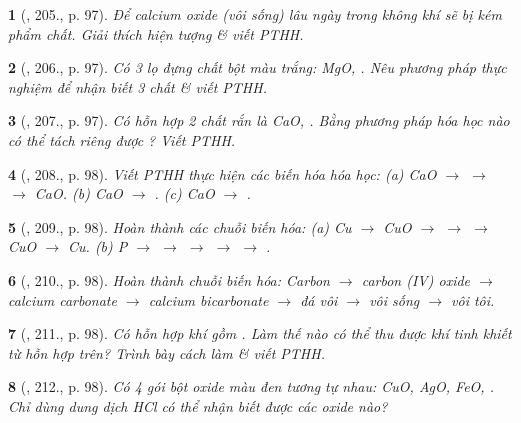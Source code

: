 \documentclass{article}
\newtheorem{baitoan}{}
\begin{document}
\begin{baitoan}[\cite{Nguyen_Buu_Can_500_BT_Hoa_Hoc_THCS}, 205., p. 97]
	Để calcium oxide (vôi sống) lâu ngày trong không khí sẽ bị kém phẩm chất. Giải thích hiện tượng \& viết {\rm PTHH}.
\end{baitoan}

\begin{baitoan}[\cite{Nguyen_Buu_Can_500_BT_Hoa_Hoc_THCS}, 206., p. 97]
	Có 3 lọ đựng chất bột màu trắng: {\rm MgO, }. Nêu phương pháp thực nghiệm để nhận biết 3 chất \& viết {\rm PTHH}.
\end{baitoan}

\begin{baitoan}[\cite{Nguyen_Buu_Can_500_BT_Hoa_Hoc_THCS}, 207., p. 97]
	Có hỗn hợp 2 chất rắn là {\rm CaO, }. Bằng phương pháp hóa học nào có thể tách riêng được {\rm{}}? Viết {\rm PTHH}.
\end{baitoan}

\begin{baitoan}[\cite{Nguyen_Buu_Can_500_BT_Hoa_Hoc_THCS}, 208., p. 98]
	Viết {\rm PTHH} thực hiện các biến hóa hóa học: {\rm(a) CaO $\to$  $\to$  $\to$ CaO. (b) CaO $\to$ . (c) CaO $\to$ }.
\end{baitoan}

\begin{baitoan}[\cite{Nguyen_Buu_Can_500_BT_Hoa_Hoc_THCS}, 209., p. 98]
	Hoàn thành các chuỗi biến hóa: {\rm(a) Cu $\to$ CuO $\to$  $\to$  $\to$ CuO $\to$ Cu. (b) P $\to$  $\to$  $\to$  $\to$  $\to$ }.
\end{baitoan}

\begin{baitoan}[\cite{Nguyen_Buu_Can_500_BT_Hoa_Hoc_THCS}, 210., p. 98]
	Hoàn thành chuỗi biến hóa: Carbon $\to$ carbon ({\rm IV}) oxide $\to$ calcium carbonate $\to$ calcium bicarbonate $\to$ đá vôi $\to$ vôi sống $\to$ vôi tôi.
\end{baitoan}

\begin{baitoan}[\cite{Nguyen_Buu_Can_500_BT_Hoa_Hoc_THCS}, 211., p. 98]
	Có hỗn hợp khí gồm {\rm{}}. Làm thế nào có thể thu được khí {\rm{}} tinh khiết từ hỗn hợp trên? Trình bày cách làm \& viết {\rm PTHH}.
\end{baitoan}

\begin{baitoan}[\cite{Nguyen_Buu_Can_500_BT_Hoa_Hoc_THCS}, 212., p. 98]
	Có 4 gói bột oxide màu đen tương tự nhau: {\rm CuO, AgO, FeO, }. Chỉ dùng dung dịch {\rm HCl} có thể nhận biết được các oxide nào?
\end{baitoan}
\end{document}
